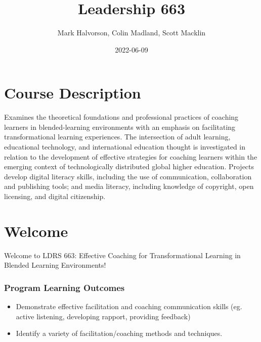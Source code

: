 \documentclass[
]{book}
\title{Leadership 663}
\author{Mark Halvorson, Colin Madland, Scott Macklin}
\date{2022-06-09}
\providecommand{\tightlist}{%
  \setlength{\itemsep}{0pt}\setlength{\parskip}{0pt}}
\begin{document}
\maketitle

{
\setcounter{tocdepth}{1}
\tableofcontents
}
\hypertarget{course-description}{%
\chapter*{Course Description}\label{course-description}}

Examines the theoretical foundations and professional practices of coaching learners in blended-learning environments with an emphasis on facilitating transformational learning experiences. The intersection of adult learning, educational technology, and international education thought is investigated in relation to the development of effective strategies for coaching learners within the emerging context of technologically distributed global higher education. Projects develop digital literacy skills, including the use of communication, collaboration and publishing tools; and media literacy, including knowledge of copyright, open licensing, and digital citizenship.

\hypertarget{welcome}{%
\chapter*{Welcome}\label{welcome}}

Welcome to LDRS 663: Effective Coaching for Transformational Learning in Blended Learning Environments!

\hypertarget{program-learning-outcomes}{%
\subsection*{Program Learning Outcomes}\label{program-learning-outcomes}}

\begin{itemize}
\tightlist
\item
  Demonstrate effective facilitation and coaching communication skills (eg. active listening, developing rapport, providing feedback)\\
\item
  Identify a variety of facilitation/coaching methods and techniques.
\end{itemize}
\end{document}
